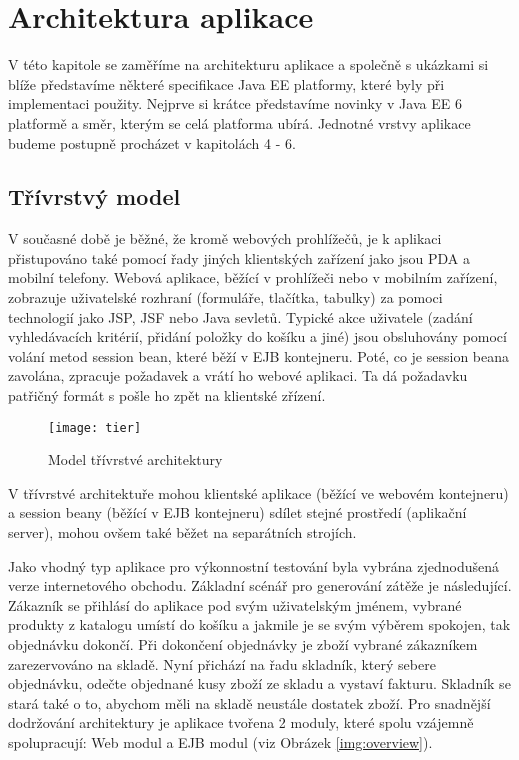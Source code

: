 \documentclass[122pt,oneside]{fithesis}
\begin{document}
\chapter{Architektura aplikace}
V této kapitole se zaměříme na architekturu aplikace a společně s ukázkami si blíže představíme některé specifikace Java EE platformy, které byly při implementaci použity. Nejprve si krátce představíme novinky v Java EE 6 platformě a směr, kterým se celá platforma ubírá. Jednotné vrstvy aplikace budeme postupně procházet v kapitolách 4 - 6.

\section{Třívrstvý model}
V současné době je běžné, že kromě webových prohlížečů, je k aplikaci přistupováno také pomocí řady jiných klientských zařízení jako jsou PDA a mobilní telefony. Webová aplikace, běžící v prohlížeči nebo v mobilním zařízení, zobrazuje uživatelské rozhraní (formuláře, tlačítka, tabulky) za pomoci technologií jako JSP, JSF nebo Java sevletů. Typické akce uživatele (zadání vyhledávacích kritérií, přidání položky do košíku a jiné) jsou obsluhovány pomocí volání metod session bean, které běží v EJB kontejneru. Poté, co je session beana zavolána, zpracuje požadavek a vrátí ho webové aplikaci. Ta dá požadavku patřičný formát s pošle ho zpět na klientské zřízení.

\begin{figure}[!ht]
\centering
\texttt{[image: tier]}
\caption{Model třívrstvé architektury ~\cite{kodali06}}
\label{img:tier}
\end{figure}

V třívrstvé architektuře mohou klientské aplikace (běžící ve webovém kontejneru) a session beany (běžící v EJB kontejneru) sdílet stejné prostředí (aplikační server), mohou ovšem také běžet na separátních strojích.

Jako vhodný typ aplikace pro výkonnostní testování byla vybrána zjednodušená verze internetového obchodu. Základní scénář pro generování zátěže je následující. Zákazník se přihlásí do aplikace pod svým uživatelským jménem, vybrané produkty z katalogu umístí do košíku a jakmile je se svým výběrem spokojen, tak objednávku dokončí. Při dokončení objednávky je zboží vybrané zákazníkem zarezervováno na skladě. Nyní přichází na řadu skladník, který sebere objednávku, odečte objednané kusy zboží ze skladu a vystaví fakturu. Skladník se stará také o to, abychom měli na skladě neustále dostatek zboží. Pro snadnější dodržování architektury je aplikace tvořena 2 moduly, které spolu vzájemně spolupracují: Web modul a EJB modul (viz Obrázek \ref{img:overview}).
\end{document}
